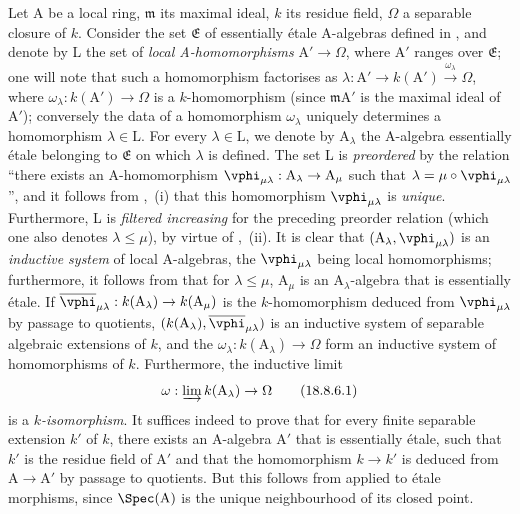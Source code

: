 \begin{env}[18.8.6]
\label{IV.18.8.6}
Let A be a local ring, $\mathfrak{m}$ its maximal ideal, $k$ its residue field, $\Omega$ a separable closure of $k$.
Consider the set $\mathfrak{E}$ of essentially \'{e}tale A-algebras defined in , and denote by L the set of \emph{local A-homomorphisms} $\mathrm{A}'\to\Omega$, where $\mathrm{A}'$ ranges over $\mathfrak{E}$;
one will note that such a homomorphism factorises as $\lambda:\mathrm{A}'\to k(\mathrm{A}')\xrightarrow{\omega_\lambda}\Omega$, where $\omega_\lambda:k(\mathrm{A}')\to\Omega$ is a $k$-homomorphism (since $\mathfrak{m}\mathrm{A}'$ is the maximal ideal of $\mathrm{A}'$);
conversely the data of a homomorphism $\omega_\lambda$ uniquely determines a homomorphism $\lambda\in\mathrm{L}$.
For every $\lambda\in\mathrm{L}$, we denote by $\mathrm{A}_\lambda$ the A-algebra essentially \'{e}tale belonging to $\mathfrak{E}$ on which $\lambda$ is defined.
The set L is \emph{preordered} by the relation ``there exists an A-homomorphism $\vphi_{\mu\lambda}:\mathrm{A}_\lambda\to\mathrm{A}_\mu$ such that $\lambda=\mu\circ\vphi_{\mu\lambda}$'', and it follows from ,~(i) that this homomorphism $\vphi_{\mu\lambda}$ is \emph{unique}.
Furthermore, L is \emph{filtered increasing} for the preceding preorder relation (which one also denotes $\lambda\leq\mu$), by virtue
of ,~(ii).
It is clear that $(\mathrm{A}_\lambda,\vphi_{\mu\lambda})$ is an \emph{inductive system} of local A-algebras, the $\vphi_{\mu\lambda}$ being local homomorphisms;
furthermore, it follows from  that for $\lambda\leq\mu$, $\mathrm{A}_\mu$ is an $\mathrm{A}_\lambda$-algebra that is essentially \'{e}tale.
If $\overline{\vphi}_{\mu\lambda}:k(\mathrm{A}_\lambda)\to k(\mathrm{A}_\mu)$ is the $k$-homomorphism deduced from $\vphi_{\mu\lambda}$ by passage to quotients, $(k(\mathrm{A}_\lambda),\overline{\vphi}_{\mu\lambda})$ is an inductive system of separable algebraic extensions of $k$, and the $\omega_\lambda:k(\mathrm{A}_\lambda)\to\Omega$ form an inductive system of homomorphisms of $k$.
Furthermore, the inductive limit
\begin{equation}
  \omega:\varinjlim k(\mathrm{A}_\lambda)\to\Omega
  \label{IV.18.8.6.1}
\tag{18.8.6.1}
\end{equation}
is a $k$\emph{-isomorphism}.
It suffices indeed to prove that for every finite separable extension $k'$ of $k$, there exists an A-algebra $\mathrm{A}'$ that is essentially \'{e}tale, such that $k'$ is the residue field of $\mathrm{A}'$ and that the homomorphism $k\to k'$ is deduced from $\mathrm{A}\to\mathrm{A}'$ by passage to quotients.
But this follows from  applied to \'{e}tale morphisms, since $\Spec(\mathrm{A})$ is the unique neighbourhood of its closed point.


\end{env}
